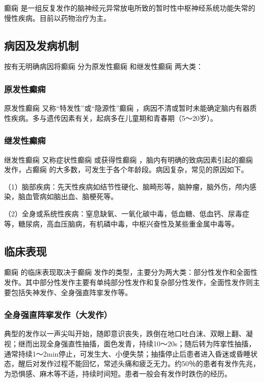 癫痫
是一组反复发作的脑神经元异常放电所致的暂时性中枢神经系统功能失常的慢性疾病。目前以药物治疗为主。

\subsection{病因及发病机制}

按有无明确病因将癫痫
分为原发性癫痫
和继发性癫痫 两大类：

\subsubsection{原发性癫痫}

原发性癫痫
又称“特发性”或“隐源性”癫痫
，病因不清或暂时未能确定脑内有器质性疾病。多与遗传因素有关，起病多在儿童期和青春期（5～20岁）。

\subsubsection{继发性癫痫}

继发性癫痫
又称症状性癫痫
或获得性癫痫
，脑内有明确的致病因素引起的癫痫
发作，占癫痫
的大多数，可发生于各个年龄段。病因复杂，常见的原因如下。

（1）脑部疾病：先天性疾病如结节性硬化、脑畸形等，脑肿瘤，脑外伤，颅内感染，脑血管病如脑出血、脑梗死等。

（2）全身或系统性疾病：窒息缺氧、一氧化碳中毒，低血糖、低血钙、尿毒症等，糖尿病，高血压脑病，有机磷中毒，中枢兴奋性及某些重金属中毒等。

\subsection{临床表现}

癫痫
的临床表现取决于癫痫
发作的类型，主要分为两大类：部分性发作和全面性发作。其中部分性发作主要有单纯部分性发作和复杂部分性发作，全面性发作则主要包括失神发作、全身强直阵挛发作等。

\subsubsection{全身强直阵挛发作（大发作）}

典型的发作以一声尖叫开始，随即意识丧失，跌倒在地口吐白沫、双眼上翻、凝视；继而出现全身强直性抽搐，面色发青，持续10～20s；随后转为阵挛性抽搐，通常持续1～2min停止，可发生大、小便失禁；抽搐停止后患者进入昏迷或昏睡状态，醒后对发作过程不能回忆，常述头痛和疲乏无力。约50％的患者有发作先兆，为恐惧感、麻木等不适，持续时间短。患者一般会有发作时跌伤的经历。

